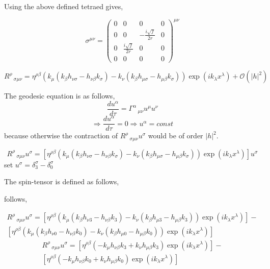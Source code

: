 \documentclass[12pt,a4paper]{article}
\begin{document}
	
	
	Using the above defined tetraed gives,
	
	$$
	\sigma^{\mu \nu} = \left(\begin{matrix}0 & 0 & 0 & 0\\0 & 0 & - \frac{i \sqrt{f}}{2 r} & 0\\0 & \frac{i \sqrt{f}}{2 r} & 0 & 0\\0 & 0 & 0 & 0\end{matrix}\right)^{\mu \nu}
	$$
	
	
	$$
	R^{\rho}\,_{\sigma \mu \nu} = \eta^{\rho \beta}\left(k_\mu \left(k_\beta h_{\nu \sigma} - h_{\nu \beta}  k_\sigma \right) - k_\nu \left( k_\beta h_{\mu \sigma} - h_{\mu \beta}  k_\sigma\right) \right) \exp\left(i k_{\lambda} x^{\lambda}\right)  + \mathcal{O}(|h|^2)
	$$
	
	The geodesic equation is as follows,
	$$
	\frac{du^\alpha}{d \tau} = \Gamma^{\alpha}\,_{\mu \nu}u^\mu u^\nu
	$$
	$$%
	\Rightarrow
	\frac{du^\alpha}{d \tau} = 0
	\Rightarrow u^\alpha = const
	$$
	because otherwise the contraction of $R^{\rho}\,_{\sigma \mu \nu}u^\sigma$ would be of order $|h|^2$.
	
	$$
	R^{\rho}\,_{\sigma \mu \nu}u^\sigma = \left[\eta^{\rho \beta}\left(k_\mu \left(k_\beta h_{\nu \sigma} - h_{\nu \beta}  k_\sigma \right) - k_\nu \left( k_\beta h_{\mu \sigma} - h_{\mu \beta}  k_\sigma\right) \right) \exp\left(i k_{\lambda} x^{\lambda}\right)\right] u^\sigma
	$$
	set $u^\sigma = \delta^\sigma_3 - \delta^\sigma_0$
	
	The spin-tensor is defined as follows,
	
	follows,
	
	\begin{multline}
		R^{\rho}\,_{\sigma \mu \nu}u^\sigma = \left[\eta^{\rho \beta}\left(k_\mu \left(k_\beta h_{\nu 3} - h_{\nu \beta}  k_3
		\right) - k_\nu \left( k_\beta h_{\mu 3} - h_{\mu \beta}  k_3 \right) \right) \exp\left(i k_{\lambda} x^{\lambda}\right)\right] - \\
		\left[\eta^{\rho \beta}\left(k_\mu \left(k_\beta h_{\nu 0} - h_{\nu \beta}  k_0 \right) - k_\nu \left( k_\beta h_{\mu 0} - h_{\mu \beta}  k_0\right) \right) \exp\left(i k_{\lambda} x^{\lambda}\right)\right] 
	\end{multline}
	\begin{multline}
		R^{\rho}\,_{\sigma \mu \nu}u^\sigma = \left[\eta^{\rho \beta}\left(- k_\mu  h_{\nu \beta}  k_3 + k_\nu h_{\mu \beta}  k_3  \right) \exp\left(i k_{\lambda} x^{\lambda}\right)\right] - \\
		\left[\eta^{\rho \beta}\left( - k_\mu  h_{\nu \beta}  k_0 + k_\nu  h_{\mu \beta}  k_0 \right) \exp\left(i k_{\lambda} x^{\lambda}\right)\right] 
	\end{multline}
	
\end{document}
